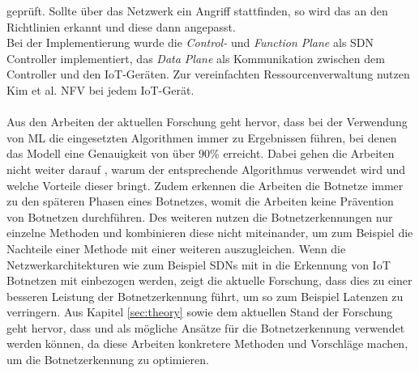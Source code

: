 geprüft. Sollte über das Netzwerk ein Angriff stattfinden, so wird das an den Richtlinien erkannt und diese dann angepasst. \\ Bei der Implementierung wurde die \textit{Control-} und \textit{Function
Plane} als SDN Controller implementiert, das \textit{Data Plane} als Kommunikation zwischen dem Controller und den IoT-Geräten. Zur vereinfachten Ressourcenverwaltung nutzen Kim et al. NFV bei jedem
IoT-Gerät. \\ \\ Aus den Arbeiten der aktuellen Forschung geht hervor, dass bei der Verwendung von ML die eingesetzten Algorithmen immer zu Ergebnissen führen, bei denen das Modell eine Genauigkeit von über 90\% erreicht. Dabei gehen die Arbeiten nicht weiter darauf , warum der entsprechende Algorithmus verwendet wird und welche Vorteile dieser bringt. Zudem erkennen die Arbeiten die Botnetze
immer zu den späteren Phasen eines Botnetzes, womit die Arbeiten keine Prävention von Botnetzen durchführen. Des weiteren nutzen die Botnetzerkennungen nur einzelne Methoden und kombinieren diese nicht miteinander, um zum Beispiel die Nachteile einer Methode mit einer weiteren auszugleichen. Wenn die Netzwerkarchitekturen wie zum Beispiel SDNs mit in die Erkennung von IoT Botnetzen mit einbezogen werden, zeigt die aktuelle Forschung, dass dies zu einer besseren Leistung der Botnetzerkennung führt, um so zum Beispiel Latenzen zu verringern. Aus Kapitel \ref{sec:theory} sowie dem aktuellen Stand der Forschung geht hervor, dass \cite{Xing2021SurveyOB} und \cite{Wazzan2021InternetOT} als mögliche Ansätze für die Botnetzerkennung verwendet werden können, da diese Arbeiten konkretere Methoden und Vorschläge machen, um die Botnetzerkennung zu optimieren.

